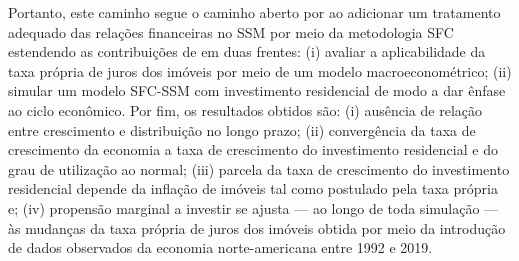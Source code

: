 Portanto, este caminho segue o caminho aberto por \textcite{brochier_supermultiplier_2018} ao adicionar um tratamento adequado das relações financeiras no SSM por meio da metodologia SFC estendendo as contribuições de \textcite{teixeira_crescimento_2015} em duas frentes:
(i) avaliar a aplicabilidade da taxa própria de juros dos imóveis por meio de um modelo macroeconométrico;
(ii) simular um modelo SFC-SSM com investimento residencial de modo a dar ênfase ao ciclo econômico.
Por fim, os resultados obtidos são:
(i) ausência de relação entre crescimento e distribuição no longo prazo; (ii) convergência
da taxa de crescimento da economia a taxa de crescimento do investimento residencial
e do grau de utilização ao normal; (iii) parcela da taxa de crescimento do investimento residencial depende da inflação de imóveis tal como postulado pela taxa própria e; (iv) propensão marginal a investir se ajusta --- ao longo de toda simulação --- às mudanças da taxa própria de juros dos imóveis obtida por meio da introdução de dados observados da  economia norte-americana entre 1992 e 2019.
 









